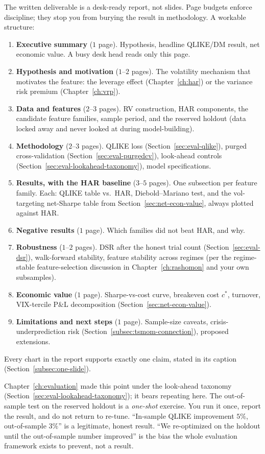 The written deliverable is a desk-ready report, not slides. Page budgets enforce discipline; they stop you from burying the result in methodology. A workable structure:
\begin{enumerate}[leftmargin=1.5em, nosep]
  \item \textbf{Executive summary} ($1$ page). Hypothesis, headline QLIKE/DM result, net economic value. A busy desk head reads only this page.
  \item \textbf{Hypothesis and motivation} ($1$--$2$ pages). The volatility mechanism that motivates the feature: the leverage effect (Chapter~\ref{ch:har}) or the variance risk premium (Chapter~\ref{ch:vrp}).
  \item \textbf{Data and features} ($2$--$3$ pages). RV construction, HAR components, the candidate feature families, sample period, and the reserved holdout (data locked away and never looked at during model-building).
  \item \textbf{Methodology} ($2$--$3$ pages). QLIKE loss (Section~\ref{sec:eval-qlike}), purged cross-validation (Section~\ref{sec:eval-purgedcv}), look-ahead controls (Section~\ref{sec:eval-lookahead-taxonomy}), model specifications.
  \item \textbf{Results, with the HAR baseline} ($3$--$5$ pages). One subsection per feature family. Each: QLIKE table vs.\ HAR, Diebold--Mariano test, and the vol-targeting net-Sharpe table from Section~\ref{sec:net-econ-value}, always plotted against HAR.
  \item \textbf{Negative results} ($1$ page). Which families did not beat HAR, and why.
  \item \textbf{Robustness} ($1$--$2$ pages). DSR after the honest trial count (Section~\ref{sec:eval-dsr}), walk-forward stability, feature stability across regimes (per the regime-stable feature-selection discussion in Chapter~\ref{ch:rashomon} and your own subsamples).
  \item \textbf{Economic value} ($1$ page). Sharpe-vs-cost curve, breakeven cost $c^\ast$, turnover, VIX-tercile P\&L decomposition (Section~\ref{sec:net-econ-value}).
  \item \textbf{Limitations and next steps} ($1$ page). Sample-size caveats, crisis-underprediction risk (Section~\ref{subsec:tsmom-connection}), proposed extensions.
\end{enumerate}
Every chart in the report supports exactly one claim, stated in its caption (Section~\ref{subsec:one-slide}).

\begin{warning}
Chapter~\ref{ch:evaluation} made this point under the look-ahead taxonomy (Section~\ref{sec:eval-lookahead-taxonomy}); it bears repeating here. The out-of-sample test on the reserved holdout is a \emph{one-shot} exercise. You run it once, report the result, and do not return to re-tune. ``In-sample QLIKE improvement $5\%$, out-of-sample $3\%$'' is a legitimate, honest result. ``We re-optimized on the holdout until the out-of-sample number improved'' is the bias the whole evaluation framework exists to prevent, not a result.
\end{warning}

